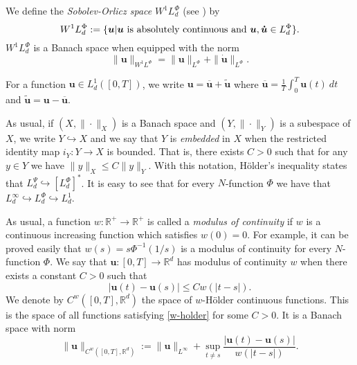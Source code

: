 \documentclass[twoside]{article}
\newcounter{nota_fer_cont}
\theoremstyle{remark}
\newcommand{\orlnor}{\|_{L^{\Phi}}}
\newcommand{\lphi}{L^{\Phi}}
\newcommand{\lpsi}{L^{\Psi}}
\newcommand{\wphi}{W^{1}\lphi}
\renewcommand{\b}[1]{\boldsymbol{#1}}
\newcommand{\rr}{\mathbb{R}}
\renewcommand{\leq}{\leqslant}
\begin{document}
We define the \emph{Sobolev-Orlicz space} $\wphi_d$ (see \cite{adams_sobolev}) by
\[\wphi_d:=\{\b{u}| \b{u} \hbox{ is absolutely continuous and } \b{u},\b{\dot{u}}\in \lphi_d\}.\]
$\wphi_d$ is a Banach space when equipped with the norm
\[
\|  \b{u}  \|_{\wphi}= \|  \b{u}  \|_{\lphi} + \|\b{\dot{u}}\orlnor.
\]



For a  function $\b{u}\in L^1_d([0,T])$, we write $\b{u}=\overline{\b{u}}+\widetilde{\b{u}}$ where $\overline{\b{u}} =\frac1T\int_0^T \b{u}(t)\ dt$ and $\widetilde{\b{u}}=\b{u}-\overline{\b{u}}$.

As usual, if $(X,\|\cdot\|_X)$ is a Banach space and $(Y,\|\cdot \|_Y)$ is a subespace of $X$,  we write $Y\hookrightarrow X$ and we say that $Y$ is \emph{embedded} in $X$  when the restricted identity map $i_Y:Y\to X$ is bounded. That is, there exists $C>0$ such that  for any $y\in Y$ we have $\|y\|_X\leq C\|y\|_Y$.  With this notation, H\"older's inequality states that  $\lpsi_d\hookrightarrow  \left[\lphi_d\right]^*$. It is easy to see that for every $N$-function $\Phi$ we have that $L^{\infty}_d\hookrightarrow\lphi_d \hookrightarrow L^1_d$.


 As usual, a function   $w:\mathbb{R}^+\to \mathbb{R}^+$ is called  a \emph{modulus of continuity} if $w$ is a continuous increasing function which satisfies $w(0)=0$. For example, it can be proved easily that $w(s)=s\Phi^{-1}(1/s)$ is a modulus of  continuity for every $N$-function $\Phi$.  We say that $\b{u}:[0,T]\to\rr^d$  has modulus of continuity $w$  when there exists a constant $C>0$ such that 
\begin{equation}\label{w-holder}|\b{u}(t)-\b{u}(s)|\leq Cw(|t-s|).
\end{equation}
We denote by $C^w([0,T],\rr^d)$  the space of  $w$-H\"older continuous functions. This is the space of all functions satisfying \eqref{w-holder} for some $C>0$. It is a Banach space with norm
\[\|\b{u}\|_{  C^w([0,T],\rr^d) }  :=\|\b{u}\|_{L^{\infty}}+\sup\limits_{t\neq s}\frac{|\b{u}(t)-\b{u}(s)|}{w(|t-s|)}.\]
\end{document}
